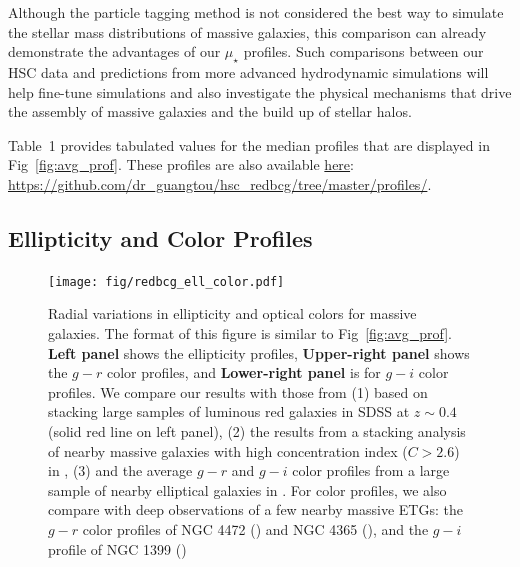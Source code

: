 \documentclass[a4paper,fleqn,usenatbib]{mnras}
\def\mden{{$\mu_{\star}$}}
\begin{document}
    Although the particle tagging method is not considered the best way to simulate
    the stellar mass distributions of massive galaxies, this comparison can already 
    demonstrate the advantages of our \mden{} profiles. 
    Such comparisons between our HSC data and predictions from more advanced 
    hydrodynamic simulations will help fine-tune simulations and also investigate 
    the physical mechanisms that drive the assembly of massive galaxies and the 
    build up of stellar halos.

    Table~1 provides tabulated values for the median profiles that are 
    displayed in Fig~\ref{fig:avg_prof}. 
    These profiles are also available  
    \href{https://github.com/dr-guangtou/hsc_redbcg/tree/master/profiles}{here}:
    {\url{https://github.com/dr_guangtou/hsc_redbcg/tree/master/profiles/}}.
    

\subsection{Ellipticity and Color Profiles}
    \label{ssec:ell_color}
    
  \begin{figure}
      \centering 
      \texttt{[image: fig/redbcg\_ell\_color.pdf]}
      \caption{
          Radial variations in ellipticity and optical colors for massive galaxies. 
          The format of this figure is similar to Fig~\ref{fig:avg_prof}. 
          \textbf{Left panel} shows the ellipticity profiles, 
          \textbf{Upper-right panel} shows the $g-r$ color profiles, and 
          \textbf{Lower-right panel} is for $g-i$ color profiles. 
          We compare our results with those from (1) \citet{Tal2011} based on stacking 
          large samples of luminous red galaxies in SDSS at $z{\sim} 0.4$ 
          (solid red line on left panel), 
          (2) the results from a stacking analysis of nearby massive 
          galaxies with high concentration index ($C>2.6$) in 
          \citet[][blue dash lines on the left and upper-right panels]{DSouza2014}, 
          (3) and the average $g-r$ and $g-i$ color profiles 
          from a large sample of nearby elliptical galaxies in \citet[][blue, solid 
          lines on both right panels]{LaBarbera2010}.
          For color profiles, we also compare with deep observations of a few nearby 
          massive ETGs: the $g-r$ color profiles of NGC 4472 (\citealt{Mihos2013}) 
          and NGC 4365 (\citealt{Mihos2017}), and the $g-i$ profile of NGC 1399 
          (\citealt{Iodice2016})
          }
      \label{fig:ell_color}
  \end{figure}
    
\end{document}
